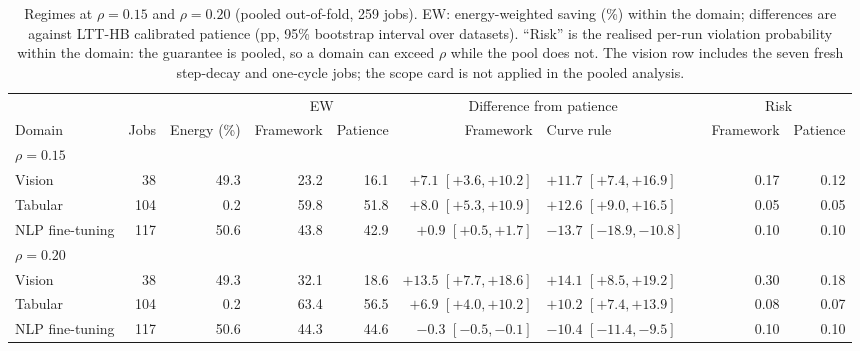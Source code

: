 \documentclass[3p,twocolumn,10pt]{elsarticle}
\theoremstyle{definition}
\begin{document}
\begin{table}[t]
\centering
\caption{Regimes at $\rho=0.15$ and $\rho=0.20$ (pooled out-of-fold, 259 jobs). EW: energy-weighted saving (\%) within the domain; differences are against LTT-HB calibrated patience (pp, 95\% bootstrap interval over datasets). ``Risk'' is the realised per-run violation probability within the domain: the guarantee is pooled, so a domain can exceed $\rho$ while the pool does not. The vision row includes the seven fresh step-decay and one-cycle jobs; the scope card is not applied in the pooled analysis.}
\label{tab:regime}
\footnotesize
\begin{adjustbox}{max width=\textwidth}
\begin{tabular}{lrrrrrllrr}
\toprule
 & & & \multicolumn{2}{c}{EW} & \multicolumn{2}{c}{Difference from patience} & & \multicolumn{2}{c}{Risk} \\
\cmidrule(lr){4-5}\cmidrule(lr){6-7}\cmidrule(lr){9-10}
Domain & Jobs & Energy (\%) & Framework & Patience & Framework & Curve rule & & Framework & Patience \\
\midrule
\multicolumn{10}{l}{\emph{$\rho=0.15$}}\\
Vision & 38 & 49.3 & 23.2 & 16.1 & $+7.1$ $[+3.6,+10.2]$ & $+11.7$ $[+7.4,+16.9]$ & & 0.17 & 0.12 \\
Tabular & 104 & 0.2 & 59.8 & 51.8 & $+8.0$ $[+5.3,+10.9]$ & $+12.6$ $[+9.0,+16.5]$ & & 0.05 & 0.05 \\
NLP fine-tuning & 117 & 50.6 & 43.8 & 42.9 & $+0.9$ $[+0.5,+1.7]$ & $-13.7$ $[-18.9,-10.8]$ & & 0.10 & 0.10 \\
\midrule
\multicolumn{10}{l}{\emph{$\rho=0.20$}}\\
Vision & 38 & 49.3 & 32.1 & 18.6 & $+13.5$ $[+7.7,+18.6]$ & $+14.1$ $[+8.5,+19.2]$ & & 0.30 & 0.18 \\
Tabular & 104 & 0.2 & 63.4 & 56.5 & $+6.9$ $[+4.0,+10.2]$ & $+10.2$ $[+7.4,+13.9]$ & & 0.08 & 0.07 \\
NLP fine-tuning & 117 & 50.6 & 44.3 & 44.6 & $-0.3$ $[-0.5,-0.1]$ & $-10.4$ $[-11.4,-9.5]$ & & 0.10 & 0.10 \\
\bottomrule
\end{tabular}
\end{adjustbox}
\end{table}
\end{document}
